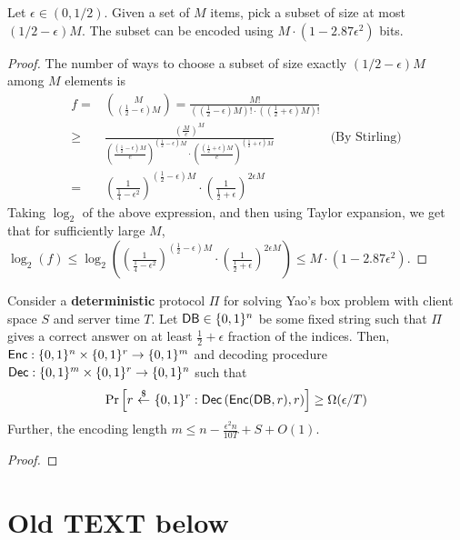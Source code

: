 \begin{fact}
Let $\epsilon \in (0, 1/2)$. 
Given a set of $M$ items, 
pick a subset of size at most $(1/2 - \epsilon)M$. 
The subset 
can be encoded using $M \cdot (1- 2.87 \epsilon^2)$ bits. 
\end{fact}
\begin{proof}
The number of ways to choose  
a subset of size exactly $(1/2 - \epsilon)M$
among $M$ elements is 
\begin{align*}
 f = & {M \choose (\frac12 - \epsilon)M }
= \frac{M!}{\left((\frac12 - \epsilon)M\right)! \cdot \left((\frac12 + \epsilon)M\right)!}\\
 \geq & \frac{\left(\frac{M}{e}\right)^M}{\left(\frac{(\frac12-\epsilon)M}{e}
\right)^{(\frac12-\epsilon)M} \cdot \left(\frac{(\frac12+\epsilon)M}{e}
\right)^{(\frac12+\epsilon)M}} & \text{(By Stirling)}\\  
 = & \left(\frac{1}{\frac14- \epsilon^2}\right)^{(\frac12 - \epsilon)M} 
\cdot 
\left(\frac{1}{\frac12 + \epsilon}\right)^{2\epsilon M}
\end{align*}
Taking $\log_2 $ of the 
above expression, 
and then using Taylor expansion, we get that 
for sufficiently large $M$, 
$\log_2(f) \leq 
\log_2\left(
\left(\frac{1}{\frac14- \epsilon^2}\right)^{(\frac12 - \epsilon)M}
\cdot
\left(\frac{1}{\frac12 + \epsilon}\right)^{2\epsilon M}
\right) \leq M \cdot (1 - 2.87\epsilon^2)$.
\end{proof}


\begin{lemma}
Consider a {\bf deterministic}
protocol $\Pi$ for solving Yao's box problem with 
client space $S$ and server time $T$. 
Let ${\sf DB} \in \{0, 1\}^n$ be some fixed string 
such that 
$\Pi$ gives a correct answer
on  
at least $\frac{1}{2} + \epsilon$ 
fraction of the indices.
Then, 
${\sf Enc}: \{0, 1\}^n \times \{0, 1\}^r \rightarrow \{0, 1\}^m$
and decoding procedure
${\sf Dec}: \{0, 1\}^m \times \{0, 1\}^r \rightarrow \{0, 1\}^n$
such that
\[
\Pr\left[r ~{\overset{\$}{\leftarrow}}~ \{0, 1\}^r: 
{\sf Dec}\left({\sf Enc}({\sf DB}, r), r\right) 
\right]
\geq 
\Omega(\epsilon/T)
\]
Further, the encoding length 
$m \leq n - \frac{\epsilon^2 n}{10T} + S + O(1)$.
\end{lemma}
\begin{proof}
\end{proof}


\section*{Old TEXT below}
\vspace{5mm}


